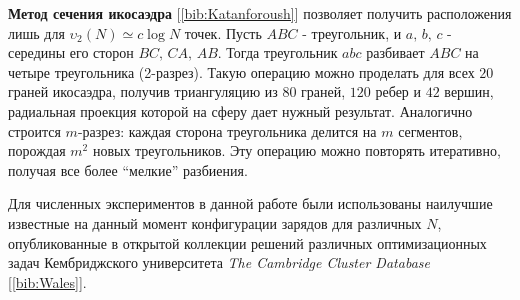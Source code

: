 \textbf{Метод сечения икосаэдра} [\ref{bib:Katanforoush}] позволяет получить расположения лишь 
для $\upsilon_2(N) \simeq c\log{}N$ точек. 
Пусть $ABC$ - треугольник, и $a,\,b,\,c$ - середины его сторон $BC,\,CA,\,AB$. 
Тогда треугольник $abc$ разбивает $ABC$ на четыре треугольника (2-разрез). 
Такую операцию можно проделать для всех $20$ граней икосаэдра, 
получив триангуляцию из $80$ граней, $120$ ребер и $42$ вершин, радиальная проекция которой на сферу дает нужный результат. 
Аналогично строится $m$-разрез: каждая сторона треугольника делится на $m$ сегментов, порождая $m^2$ новых треугольников.
Эту операцию можно повторять итеративно, получая все более \enquote{мелкие} разбиения. 

Для численных экспериментов в данной работе были использованы наилучшие 
известные на данный момент конфигурации зарядов для различных $N$, опубликованные 
в открытой коллекции решений различных оптимизационных задач Кембриджского университета
\textit{The Cambridge Cluster Database} [\ref{bib:Wales}].


